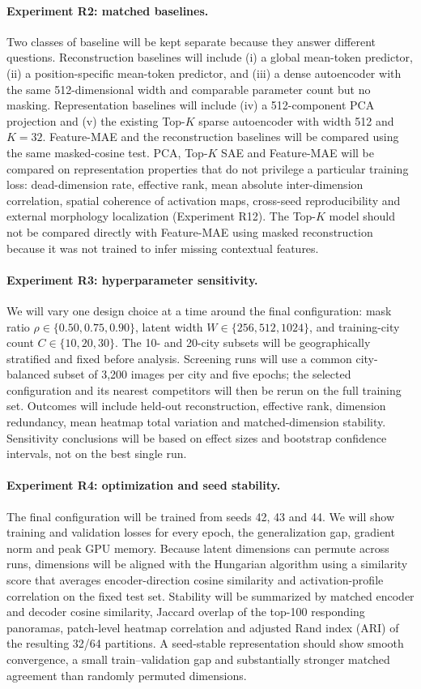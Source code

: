 \paragraph{Experiment R2: matched baselines.}
Two classes of baseline will be kept separate because they answer different
questions. Reconstruction baselines will include (i) a global mean-token
predictor, (ii) a position-specific mean-token predictor, and (iii) a dense
autoencoder with the same 512-dimensional width and comparable parameter count
but no masking. Representation baselines will include (iv) a 512-component PCA
projection and (v) the existing Top-$K$ sparse autoencoder with width 512 and
$K=32$. Feature-MAE and the reconstruction baselines will be compared using the
same masked-cosine test. PCA, Top-$K$ SAE and Feature-MAE will be compared on
representation properties that do not privilege a particular training loss:
dead-dimension rate, effective rank, mean absolute inter-dimension correlation,
spatial coherence of activation maps, cross-seed reproducibility and external
morphology localization (Experiment R12). The Top-$K$ model should not be
compared directly with Feature-MAE using masked reconstruction because it was
not trained to infer missing contextual features.

\paragraph{Experiment R3: hyperparameter sensitivity.}
We will vary one design choice at a time around the final configuration:
mask ratio $\rho\in\{0.50,0.75,0.90\}$, latent width
$W\in\{256,512,1024\}$, and training-city count
$C\in\{10,20,30\}$. The 10- and 20-city subsets will be geographically
stratified and fixed before analysis. Screening runs will use a common
city-balanced subset of 3,200 images per city and five epochs; the selected
configuration and its nearest competitors will then be rerun on the full
training set. Outcomes will include held-out reconstruction, effective rank,
dimension redundancy, mean heatmap total variation and matched-dimension
stability. Sensitivity conclusions will be based on effect sizes and bootstrap
confidence intervals, not on the best single run.

\paragraph{Experiment R4: optimization and seed stability.}
The final configuration will be trained from seeds 42, 43 and 44. We will show
training and validation losses for every epoch, the generalization gap, gradient
norm and peak GPU memory. Because latent dimensions can permute across runs,
dimensions will be aligned with the Hungarian algorithm using a similarity
score that averages encoder-direction cosine similarity and activation-profile
correlation on the fixed test set. Stability will be summarized by matched
encoder and decoder cosine similarity, Jaccard overlap of the top-100 responding
panoramas, patch-level heatmap correlation and adjusted Rand index (ARI) of the
resulting 32/64 partitions. A seed-stable representation should show smooth
convergence, a small train--validation gap and substantially stronger matched
agreement than randomly permuted dimensions.

